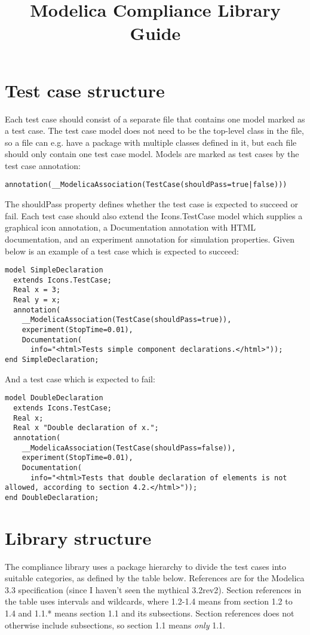 \documentclass{article}
\begin{document}


\title{Modelica Compliance Library Guide}
\maketitle

\section{Test case structure}
Each test case should consist of a separate file that contains one
model marked as a test case. The test case model does not need to be the
top-level class in the file, so a file can e.g. have a package with multiple
classes defined in it, but each file should only contain one test case model.
Models are marked as test cases by the test case annotation:
\begin{lstlisting}[language=modelica]
annotation(__ModelicaAssociation(TestCase(shouldPass=true|false)))
\end{lstlisting}
The shouldPass property defines whether the test case is expected to succeed or
fail. Each test case should also extend the Icons.TestCase model which supplies
a graphical icon annotation, a Documentation annotation with HTML documentation,
and an experiment annotation for simulation properties. Given below is an
example of a test case which is expected to succeed:
\begin{lstlisting}[language=modelica]
model SimpleDeclaration
  extends Icons.TestCase;
  Real x = 3;
  Real y = x;
  annotation(
    __ModelicaAssociation(TestCase(shouldPass=true)),
    experiment(StopTime=0.01),
    Documentation(
      info="<html>Tests simple component declarations.</html>"));
end SimpleDeclaration;
\end{lstlisting}
And a test case which is expected to fail:
\begin{lstlisting}[language=modelica]
model DoubleDeclaration
  extends Icons.TestCase;
  Real x;
  Real x "Double declaration of x.";
  annotation(
    __ModelicaAssociation(TestCase(shouldPass=false)),
    experiment(StopTime=0.01),
    Documentation(
      info="<html>Tests that double declaration of elements is not allowed, according to section 4.2.</html>"));
end DoubleDeclaration;
\end{lstlisting}
\section{Library structure}
The compliance library uses a package hierarchy to divide the test cases into
suitable categories, as defined by the table below. References are for the
Modelica 3.3 specification (since I haven't seen the mythical 3.2rev2). Section
references in the table uses intervals and wildcards, where 1.2-1.4 means from
section 1.2 to 1.4 and 1.1.* means section 1.1 and its subsections. Section
references does not otherwise include subsections, so section 1.1 means
\emph{only} 1.1.
%
%
%
\end{document}
